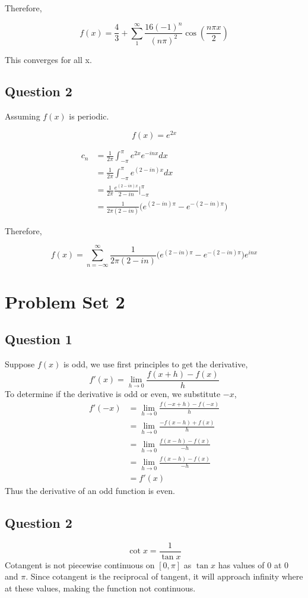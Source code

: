 \documentclass[titlepage]{article}
\begin{document}
Therefore,

$$f(x) = \frac{4}{3} + \sum_1^{\infty} \frac{16 (-1)^n}{(n\pi)^2}\cos(\frac{n\pi x}{2})$$

This converges for all x.
\subsection*{Question 2}

Assuming $f(x)$ is periodic.

$$f(x) = e^{2x}$$

\begin{align*}
    c_n &= \frac{1}{2\pi} \int_{-\pi}^{\pi} e^{2x}e^{-inx} dx
    \\ &= \frac{1}{2\pi} \int_{-\pi}^{\pi} e^{(2 - in)x} dx
    \\ &= \frac{1}{2\pi} \frac{e^{(2 - in)x}}{2 - in} \bigg|_{-\pi}^{\pi}
    \\ &= \frac{1}{2\pi(2 - in)}\bigg(e^{(2 - in)\pi} - e^{-(2 - in)\pi}\bigg)
\end{align*}

Therefore,

$$f(x) = \sum_{n=-\infty}^{\infty} \frac{1}{2\pi(2 - in)}\bigg(e^{(2 - in)\pi} - e^{-(2 - in)\pi}\bigg) e^{inx}$$

\section*{Problem Set 2}
\subsection*{Question 1}
Suppose $f(x)$ is odd, we use first principles to get the derivative, $$f'(x)= \lim_{h\to0}\frac{f(x+h)-f(x)}{h}$$ To determine if the derivative is odd or even, we substitute $-x$,
\begin{align*}
    f'(-x) &= \lim_{h\to0}\frac{f(-x+h)-f(-x)}{h} \\
    &= \lim_{h\to0}\frac{-f(x-h)+f(x)}{h} \\
    &= \lim_{h\to0}\frac{f(x-h)-f(x)}{-h} \\
    &= \lim_{h\to0}\frac{f(x-h)-f(x)}{-h} \\
    &= f'(x)
\end{align*}
Thus the derivative of an odd function is even.

\subsection*{Question 2}
$$\cot x = \frac{1}{\tan x}$$
Cotangent is not piecewise continuous on $[0, \pi]$ as $\tan x$ has values of $0$ at $0$ and $\pi$. Since cotangent is the reciprocal of tangent, it will approach infinity where at these values, making the function not continuous.
\end{document}
